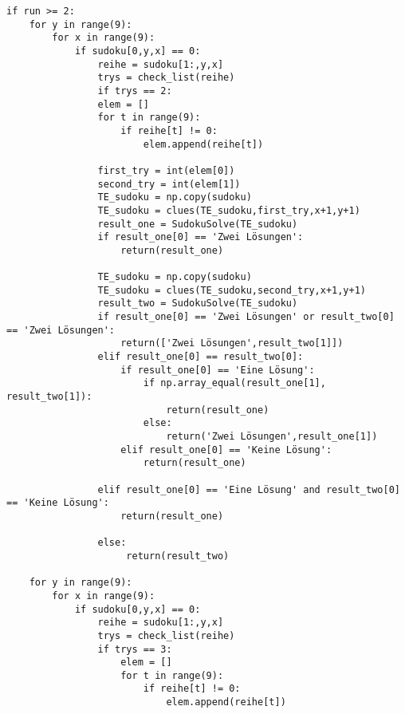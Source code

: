 \documentclass[11pt,a4paper]{article}
\begin{document}
\begin{verbatim}
if run >= 2:
    for y in range(9):       
        for x in range(9):            
            if sudoku[0,y,x] == 0:       
                reihe = sudoku[1:,y,x]    
                trys = check_list(reihe) 
                if trys == 2:            
                elem = []                    
                for t in range(9):            
                    if reihe[t] != 0:         
                        elem.append(reihe[t]) 
                                    
                first_try = int(elem[0])      
                second_try = int(elem[1])     
                TE_sudoku = np.copy(sudoku)   
                TE_sudoku = clues(TE_sudoku,first_try,x+1,y+1) 
                result_one = SudokuSolve(TE_sudoku)  
                if result_one[0] == 'Zwei Lösungen': 
                    return(result_one)               
                
                TE_sudoku = np.copy(sudoku)                     
                TE_sudoku = clues(TE_sudoku,second_try,x+1,y+1) 
                result_two = SudokuSolve(TE_sudoku)             
                if result_one[0] == 'Zwei Lösungen' or result_two[0] == 'Zwei Lösungen':
                    return(['Zwei Lösungen',result_two[1]])                                
                elif result_one[0] == result_two[0]:                                     
                    if result_one[0] == 'Eine Lösung':                   
                        if np.array_equal(result_one[1], result_two[1]): 
                            return(result_one)                           
                        else:                                            
                            return('Zwei Lösungen',result_one[1])        
                    elif result_one[0] == 'Keine Lösung':                
                        return(result_one)                               
                            
                elif result_one[0] == 'Eine Lösung' and result_two[0] == 'Keine Lösung': 
                    return(result_one)                                                   
                
                else:                                                                    
                     return(result_two)                                                   
           
    for y in range(9):                 
        for x in range(9):        
            if sudoku[0,y,x] == 0:           
                reihe = sudoku[1:,y,x]       
                trys = check_list(reihe)     
                if trys == 3:               
                    elem = []                     
                    for t in range(9):             
                        if reihe[t] != 0:          
                            elem.append(reihe[t]) 
                                    

\end{verbatim}
\end{document}
